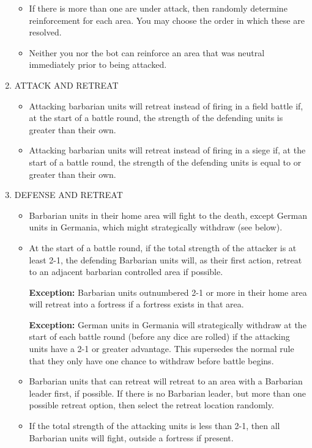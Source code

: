 \begin{enumerate}
\begin{itemize}
    \item If there is more than one are under attack, then randomly determine reinforcement for each area. You may choose the order in which these are resolved.
    
    \item Neither you nor the bot can reinforce an area that was neutral immediately prior to being attacked.
  \end{itemize}
  
  \item ATTACK AND RETREAT
  \begin{itemize}
    \item Attacking barbarian units will retreat instead of firing in a field battle if, at the start of a battle round, the strength of the defending units is greater than their own.
    \item Attacking barbarian units will retreat instead of firing in a siege if, at the start of a battle round, the strength of the defending units is equal to or greater than their own.
  \end{itemize}
  
  \item DEFENSE AND RETREAT
  \begin{itemize}
    \item Barbarian units in their home area will fight to the death, except German units in Germania, which might strategically withdraw (see below).
    \item At the start of a battle round, if the total strength of the attacker is at least 2-1, the defending Barbarian units will, as their first action, retreat to an adjacent barbarian controlled area if possible.
    
    \textbf{Exception:} Barbarian units outnumbered 2-1 or more in their home area will retreat into a fortress if a fortress exists in that area.
    
    \textbf{Exception:} German units in Germania will strategically withdraw at the start of each battle round (before any dice are rolled) if the attacking units have a 2-1 or greater advantage. This supersedes the normal rule that they only have one chance to withdraw before battle begins.
    \item Barbarian units that can retreat will retreat to an area with a Barbarian leader first, if possible. If there is no Barbarian leader, but more than one possible retreat option, then select the retreat location randomly.
    \item If the total strength of the attacking units is less than 2-1, then all Barbarian units will fight, outside a fortress if present.
  \end{itemize}
  

\end{enumerate}
